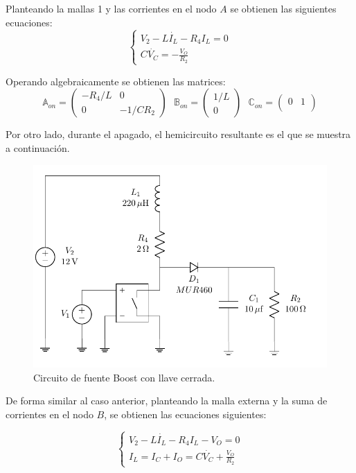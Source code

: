 Planteando la mallas 1 y las corrientes en el nodo $A$ se obtienen las siguientes ecuaciones:
\begin{equation}
\begin{cases}
V_2 - L \dot{I_L} - R_4 I_L = 0 \\
C \dot{V_C} = -\frac{V_O}{R_2}
\end{cases}
\label{ej2:eq:on}
\end{equation}

Operando algebraicamente se obtienen las matrices: 
\begin{equation*}
\mathbb{A}_{on} =  \begin{pmatrix}
	-R_4/L & 0 \\
	0 & -1/ C R_2
\end{pmatrix} \ \ \
\mathbb{B}_{on} =  \begin{pmatrix}
	1/L \\
	0
\end{pmatrix} \ \ \
\mathbb{C}_{on} =  \begin{pmatrix}
	0 & 1 \\
\end{pmatrix}
\end{equation*}

Por otro lado, durante el apagado, el hemicircuito resultante es el que se muestra a continuación.

\begin{figure}[H]
	\centering
	\includegraphics[width=0.6\linewidth, page=3]{ImagenesEjercicio-2/CircuitsEj2}
	\caption{Circuito de fuente Boost con llave cerrada.}
	\label{fig:ej2:circuito_on}
\end{figure}

De forma similar al caso anterior, planteando la malla externa y la suma de corrientes en el nodo $B$, se obtienen las ecuaciones siguientes:

\begin{equation}
\begin{cases}
V_2 - L \dot{I_L} - R_4 I_L - V_O = 0 \\
I_L = I_C + I_O = C\dot{V_C} + \frac{V_O}{R_2}
\end{cases}
\label{ej2:eq:off}
\end{equation}

